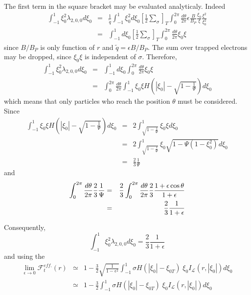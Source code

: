The first term in the square bracket may be evaluated analyticaly. Indeed
\begin{eqnarray}
\int_{-1}^{1}\xi _{0}^{2}\lambda _{2,0,0}d\xi _{0} &=&\frac{1}{\widetilde{q}}%
\int_{-1}^{1}\xi _{0}^{2}d\xi _{0}\left[ \frac{1}{2}\sum_{\sigma }\right]
_{T}\int_{0}^{2\pi }\frac{d\theta }{2\pi }\epsilon \frac{B}{B_{P}}\frac{\xi
_{0}}{\xi }\frac{\xi ^{2}}{\xi _{0}^{2}}  \nonumber \\
&=&\int_{-1}^{1}d\xi _{0}\left[ \frac{1}{2}\sum_{\sigma }\right]
_{T}\int_{0}^{2\pi }\frac{d\theta }{2\pi }\xi _{0}\xi
\end{eqnarray}
since $B/B_{P}$ is only function of $r$ and $\widetilde{q}=\epsilon B/B_{P}.$
The sum over trapped electrons may be dropped, since $\xi _{0}\xi $ is
independent of $\sigma .$ Therefore,
\begin{eqnarray}
\int_{-1}^{1}\xi _{0}^{2}\lambda _{2,0,0}d\xi _{0} &=&\int_{-1}^{1}d\xi
_{0}\int_{0}^{2\pi }\frac{d\theta }{2\pi }\xi _{0}\xi  \nonumber \\
&=&\int_{0}^{2\pi }\frac{d\theta }{2\pi }\int_{-1}^{1}\xi _{0}\xi H\left(
\left| \xi _{0}\right| -\sqrt{1-\frac{1}{\Psi }}\right) d\xi _{0}
\end{eqnarray}
which means that only particles who reach the position $\theta $ must be
considered. Since
\begin{eqnarray}
\int_{-1}^{1}\xi _{0}\xi H\left( \left| \xi _{0}\right| -\sqrt{1-\frac{1}{
\Psi }}\right) d\xi _{0} &=&2\int_{\sqrt{1-\frac{1}{\Psi }}}^{1}\xi _{0}\xi
d\xi _{0}  \nonumber \\
&=&2\int_{\sqrt{1-\frac{1}{\Psi }}}^{1}\xi _{0}\sqrt{1-\Psi \left( 1-\xi
_{0}^{2}\right) }d\xi _{0}  \nonumber \\
&=&\frac{2}{3}\frac{1}{\Psi }
\end{eqnarray}
and
\begin{eqnarray}
\int_{0}^{2\pi }\frac{d\theta }{2\pi }\frac{2}{3}\frac{1}{\Psi } &=&\frac{2}{%
3}\int_{0}^{2\pi }\frac{d\theta }{2\pi }\frac{2}{3}\frac{1+\epsilon \cos
\theta }{1+\epsilon }  \nonumber \\
&=&\frac{2}{3}\frac{1}{1+\epsilon }
\end{eqnarray}

Consequently,
\begin{equation}
\int_{-1}^{1}\xi _{0}^{2}\lambda _{2,0,0}d\xi _{0}=\frac{2}{3}\frac{1}{
1+\epsilon }
\end{equation}
and using the
\begin{eqnarray}
\lim_{\epsilon \rightarrow 0}\mathcal{F}_{t}^{eff.}\left( r\right) &\simeq
&1-\frac{3}{2}\sqrt{\frac{1}{1-\epsilon ^{2}}}\int_{-1}^{1}\sigma H\left(
\left| \xi _{0}\right| -\xi _{0T}\right) \;\xi _{0}I_{\mathcal{L}}\left(
r,\left| \xi _{0}\right| \right) d\xi _{0}  \nonumber \\
&\simeq &1-\frac{3}{2}\int_{-1}^{1}\sigma H\left( \left| \xi _{0}\right|
-\xi _{0T}\right) \;\xi _{0}I_{\mathcal{L}}\left( r,\left| \xi _{0}\right|
\right) d\xi _{0}
\end{eqnarray}

